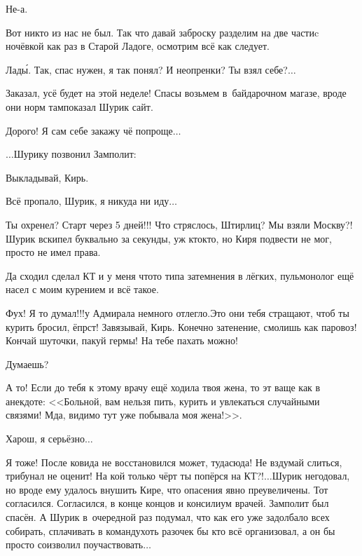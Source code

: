 \diagdash Не-а.

\diagdash Вот никто из нас не был. Так что давай заброску разделим на две части\mdash c ночёвкой как раз в Старой Ладоге, осмотрим всё как следует.

\diagdash Лад\'{ы}. Так, спас нужен, я так понял? И неопренки? Ты взял себе?$\ldots$

\diagdash Заказал, усё будет на этой неделе! Спасы возьмем в~байдарочном магазе, вроде они норм там\mdash показал Шурик сайт.

\diagdash Дорого! Я сам себе закажу чё попроще$\ldots$



\newpage
$\ldots$Шурику позвонил Замполит:

\diagdash Выкладывай, Кирь.

\diagdash Всё пропало, Шурик, я никуда ни иду$\ldots$

\diagdash Ты охренел? Старт через 5 дней!!! Что стряслось, Штирлиц? Мы взяли Москву?! \mdash Шурик вскипел буквально за секунды, уж кто\sdash кто, но Киря подвести не мог, просто не имел права. 

\diagdash Да сходил сделал КТ и у меня что\sdash то типа затемнения в лёгких, пульмонолог ещё насел с моим курением и всё такое.

\diagdash Фух! Я то думал!!!\mdash у Адмирала немного отлегло.\mdash Это они тебя стращают, чтоб ты курить бросил, ёпрст! Завязывай, Кирь. Конечно затенение, смолишь как паровоз! Кончай шуточки, пакуй гермы! На тебе пахать можно!

\diagdash Думаешь?

\diagdash А то! Если до тебя к этому врачу ещё ходила твоя жена, то эт ваще как в анекдоте: <<Больной, вам нельзя пить, курить и увлекаться случайными связями! \ndash Мда, видимо тут уже побывала моя жена!>>.

\diagdash Харош, я серьёзно$\ldots$

\diagdash Я тоже! После ковида не восстановился может, туда\sdash сюда! Не вздумай слиться, трибунал не оценит! На кой только чёрт ты попёрся на КТ?!$\ldots$\mdash Шурик негодовал, но вроде ему удалось внушить Кире, что опасения явно преувеличены. Тот согласился. Согласился, в конце концов и консилиум врачей. Замполит был спасён. А Шурик в~очередной раз подумал, что как его уже задолбало всех собирать, сплачивать в команду\mdash хоть разочек бы кто всё организовал, а он бы просто соизволил поучаствовать$\ldots$


